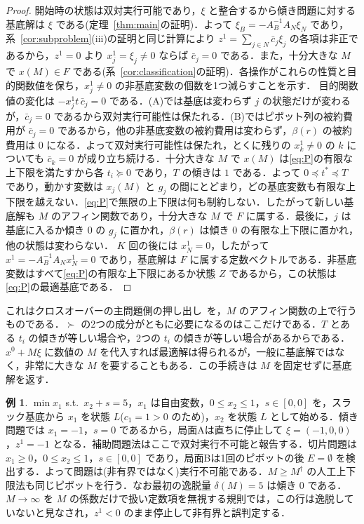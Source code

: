 \documentclass[11pt,a4paper]{ltjsarticle}
\theoremstyle{plain}
\theoremstyle{definition}
\newtheorem{example}[theorem]{例}
\theoremstyle{remark}
\begin{document}
\begin{proof}
開始時の状態は双対実行可能であり，$\xi$ と整合するから傾き問題に対する基底解は $\xi$ である(定理~\ref{thm:main}の証明)．よって $\xi_B=-A_B^{-1}A_N\xi_N$ であり，系~\ref{cor:subproblem}(iii)の証明と同じ計算により $z^1=\sum_{j\in N}\bar c_j\xi_j$ の各項は非正であるから，$z^1=0$ より $x^1_j=\xi_j\neq0$ ならば $\bar c_j=0$ である．また，十分大きな $M$ で $x(M)\in F$ である(系~\ref{cor:classification}の証明)．各操作がこれらの性質と目的関数値を保ち，$x^1_j\neq0$ の非基底変数の個数を1つ減らすことを示す．
目的関数値の変化は $-x^1_jt\,\bar c_j=0$ である．(A)では基底は変わらず $j$ の状態だけが変わるが，$\bar c_j=0$ であるから双対実行可能性は保たれる．(B)ではピボット列の被約費用が $\bar c_j=0$ であるから，他の非基底変数の被約費用は変わらず，$\beta(r)$ の被約費用は $0$ になる．よって双対実行可能性は保たれ，とくに残りの $x^1_k\neq0$ の $k$ についても $\bar c_k=0$ が成り立ち続ける．十分大きな $M$ で $x(M)$ は\eqref{eq:P}の有限な上下限を満たすから各 $t_i\succeq0$ であり，$T$ の傾きは $1$ である．よって $0\preceq t^\ast\preceq T$ であり，動かす変数は $x_j(M)$ と $g_j$ の間にとどまり，どの基底変数も有限な上下限を越えない．\eqref{eq:P}で無限の上下限は何も制約しない．したがって新しい基底解も $M$ のアフィン関数であり，十分大きな $M$ で $F$ に属する．最後に，$j$ は基底に入るか傾き $0$ の $g_j$ に置かれ，$\beta(r)$ は傾き $0$ の有限な上下限に置かれ，他の状態は変わらない．
$K$ 回の後には $x^1_N=0$，したがって $x^1=-A_B^{-1}A_Nx^1_N=0$ であり，基底解は $F$ に属する定数ベクトルである．非基底変数はすべて\eqref{eq:P}の有限な上下限にあるか状態 $Z$ であるから，この状態は\eqref{eq:P}の最適基底である．
\end{proof}

これはクロスオーバーの主問題側の押し出し~\cite{megiddo1991,bixby1994}を，$M$ のアフィン関数の上で行うものである．$\succ$ の2つの成分がともに必要になるのはここだけである．$T$ とある $t_i$ の傾きが等しい場合や，2つの $t_i$ の傾きが等しい場合があるからである．$x^0+M\xi$ に数値の $M$ を代入すれば最適解は得られるが，一般に基底解ではなく，非常に大きな $M$ を要することもある．この手続きは $M$ を固定せずに基底解を返す．

\begin{example}
$\min x_1$ s.t.\ $x_2+s=5$，$x_1$ は自由変数，$0\le x_2\le1$，$s\in[0,0]$ を，スラック基底から $x_1$ を状態 $L$($c_1=1>0$ のため)，$x_2$ を状態 $L$ として始める．傾き問題では $x_1=-1$，$s=0$ であるから，局面Aは直ちに停止して $\xi=(-1,0,0)$，$z^1=-1$ となる．補助問題法はここで双対実行不可能と報告する．切片問題は $x_1\ge0$，$0\le x_2\le1$，$s\in[0,0]$ であり，局面Bは1回のピボットの後 $E=\emptyset$ を検出する．よって問題は(非有界ではなく)実行不可能である．$M\ge M^\dagger$ の人工上下限法も同じピボットを行う．なお最初の逸脱量 $\delta(M)=5$ は傾き $0$ である．$M\to\infty$ を $M$ の係数だけで扱い定数項を無視する規則では，この行は逸脱していないと見なされ，$z^1<0$ のまま停止して非有界と誤判定する．
\end{example}
\end{document}
